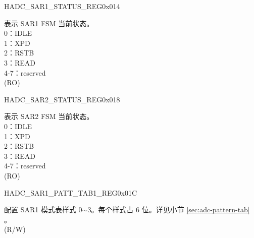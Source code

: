 \begin{register}{H}{ADC\_SAR1\_STATUS\_REG}{0x014}\label{regdesc:ADCSAR1STATUSREG}
%
%
\regnewline%
\begin{regdesc}\begin{reglist}
\label{fielddesc:ADCSAR1STATE}\item [ADC\_SAR1\_STATE] 表示 SAR1 FSM 当前状态。\\
0：IDLE\\
1：XPD\\
2：RSTB\\
3：READ\\
4-7：reserved \\
(RO)
\end{reglist}\end{regdesc}
\end{register}


\begin{register}{H}{ADC\_SAR2\_STATUS\_REG}{0x018}\label{regdesc:ADCSAR2STATUSREG}
%
%
\regnewline%
\begin{regdesc}\begin{reglist}
\label{fielddesc:ADCSAR2STATE}\item [ADC\_SAR2\_STATE] 表示 SAR2 FSM 当前状态。\\
0：IDLE\\
1：XPD\\
2：RSTB\\
3：READ\\
4-7：reserved \\
(RO)
\end{reglist}\end{regdesc}
\end{register}


\begin{register}{H}{ADC\_SAR1\_PATT\_TAB1\_REG}{0x01C}\label{regdesc:ADCSAR1PATTTAB1REG}
%
%
\regnewline%
\begin{regdesc}\begin{reglist}
\label{fielddesc:ADCSAR1PATTTAB1}\item [ADC\_SAR1\_PATT\_TAB1] 配置 SAR1 模式表样式 0$\sim$3。每个样式占 6 位。详见小节 \ref{sec:adc-pattern-tab} \textit{}。\\
(R/W)
\end{reglist}\end{regdesc}
\end{register}


